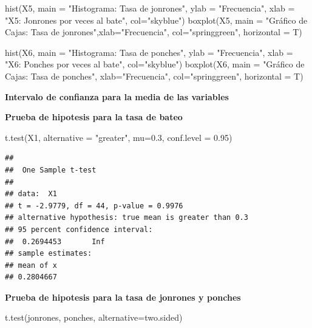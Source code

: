\documentclass{staprojteamusb}
\newenvironment{Shaded}{\begin{snugshade}}{\end{snugshade}}
\newcommand{\AttributeTok}[1]{\textcolor[rgb]{0.77,0.63,0.00}{#1}}
\newcommand{\FloatTok}[1]{\textcolor[rgb]{0.00,0.00,0.81}{#1}}
\newcommand{\FunctionTok}[1]{\textcolor[rgb]{0.00,0.00,0.00}{#1}}
\newcommand{\NormalTok}[1]{#1}
\newcommand{\StringTok}[1]{\textcolor[rgb]{0.31,0.60,0.02}{#1}}
\begin{document}
\begin{Shaded}
\begin{Highlighting}[]
\FunctionTok{hist}\NormalTok{(X5, }\AttributeTok{main =} \StringTok{"Histograma: Tasa de jonrones"}\NormalTok{, }\AttributeTok{ylab =} \StringTok{"Frecuencia"}\NormalTok{, }
     \AttributeTok{xlab =} \StringTok{"X5: Jonrones por veces al bate"}\NormalTok{, }\AttributeTok{col=}\StringTok{"skyblue"}\NormalTok{)}
\FunctionTok{boxplot}\NormalTok{(X5, }\AttributeTok{main =} \StringTok{"Gráfico de Cajas: Tasa de jonrones"}\NormalTok{,}\AttributeTok{xlab=}\StringTok{"Frecuencia"}\NormalTok{, }
        \AttributeTok{col=}\StringTok{"springgreen"}\NormalTok{, }\AttributeTok{horizontal =}\NormalTok{ T)}

\FunctionTok{hist}\NormalTok{(X6, }\AttributeTok{main =} \StringTok{"Histograma: Tasa de ponches"}\NormalTok{, }\AttributeTok{ylab =} \StringTok{"Frecuencia"}\NormalTok{, }
     \AttributeTok{xlab =} \StringTok{"X6: Ponches por veces al bate"}\NormalTok{, }\AttributeTok{col=}\StringTok{"skyblue"}\NormalTok{)}
\FunctionTok{boxplot}\NormalTok{(X6, }\AttributeTok{main =} \StringTok{"Gráfico de Cajas: Tasa de ponches"}\NormalTok{, }\AttributeTok{xlab=}\StringTok{"Frecuencia"}\NormalTok{, }
        \AttributeTok{col=}\StringTok{"springgreen"}\NormalTok{, }\AttributeTok{horizontal =}\NormalTok{ T)}
\end{Highlighting}
\end{Shaded}

 \textbf{Intervalo de confianza para la media de las variables}

 \textbf{Prueba de hipotesis para la tasa de bateo }

\begin{Shaded}
\begin{Highlighting}[]
\FunctionTok{t.test}\NormalTok{(X1, }\AttributeTok{alternative =} \StringTok{"greater"}\NormalTok{, }\AttributeTok{mu=}\FloatTok{0.3}\NormalTok{, }\AttributeTok{conf.level =} \FloatTok{0.95}\NormalTok{)}
\end{Highlighting}
\end{Shaded}

\begin{verbatim}
## 
##  One Sample t-test
## 
## data:  X1
## t = -2.9779, df = 44, p-value = 0.9976
## alternative hypothesis: true mean is greater than 0.3
## 95 percent confidence interval:
##  0.2694453       Inf
## sample estimates:
## mean of x 
## 0.2804667
\end{verbatim}

 \textbf{Prueba de hipotesis para la tasa de jonrones y ponches}

\begin{Shaded}
\begin{Highlighting}[]
\FunctionTok{t.test}\NormalTok{(jonrones, ponches, }\AttributeTok{alternative=}\StringTok{\textquotesingle{}two.sided\textquotesingle{}}\NormalTok{)}
\end{Highlighting}
\end{Shaded}
\end{document}
